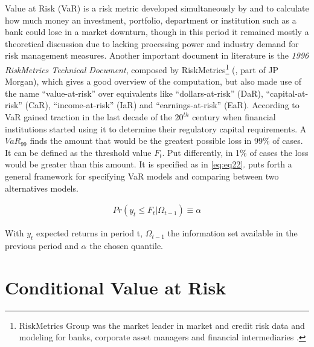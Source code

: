 \documentclass[a4paper, nobind]{templates/ociamthesis}
\begin{document}
\noindent Value at Risk (VaR) is a risk metric developed simultaneously by \textcite{markowitz1952} and \textcite{roy1952} to calculate how much money an investment, portfolio, department or institution such as a bank could lose in a market downturn, though in this period it remained mostly a theoretical discussion due to lacking processing power and industry demand for risk management measures. Another important document in literature is the \emph{1996 RiskMetrics Technical Document}, composed by RiskMetrics\footnote{RiskMetrics Group was the market leader in market and credit risk data and modeling for banks, corporate asset managers and financial intermediaries \autocite{alexander2008}.} (\textcite{morganguarantytrustcompany1996}, part of JP Morgan), which gives a good overview of the computation, but also made use of the name ``value-at-risk'' over equivalents like ``dollars-at-risk'' (DaR), ``capital-at-risk'' (CaR), ``income-at-risk'' (IaR) and ``earnings-at-risk'' (EaR). According to \textcite{holton2002} VaR gained traction in the last decade of the \(20^{th}\) century when financial institutions started using it to determine their regulatory capital requirements. A \(VaR_{99}\) finds the amount that would be the greatest possible loss in 99\% of cases. It can be defined as the threshold value \(F_t\). Put differently, in 1\% of cases the loss would be greater than this amount. It is specified as in \eqref{eq:eq22}. \textcite{christoffersen2001} puts forth a general framework for specifying VaR models and comparing between two alternatives models.

\begin{align}
Pr(y_t \le F_t | \Omega_{t-1}) \equiv \alpha
 \label{eq:eq22}
\end{align}

\noindent With \(y_t\) expected returns in period t, \(\Omega_{t-1}\) the information set available in the previous period and \(\alpha\) the chosen quantile.

\newpage

\hypertarget{conditional-value-at-risk}{%
\section{Conditional Value at Risk}\label{conditional-value-at-risk}}
\end{document}
